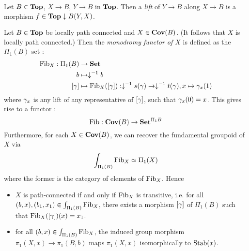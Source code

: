 \documentclass[./main.tex]{subfiles}
\begin{document}
\begin{dfn}[Lift]
  
  Let $B \in \mathbf{Top}$, $X \to B$, $Y \to B$ in $\mathbf{Top}$.
  Then a \emph{lift} of $Y \to B$ along $X \to B$ is 
  a morphism $f \in \mathbf{Top}\downarrow B(Y,X)$.
\end{dfn}

\begin{prop}
  
  Let $B \in \mathbf{Top}$ be locally path connected and $X \in \mathbf{Cov}(B)$.
  (It follows that $X$ is locally path connected.)
  Then the \emph{monodromy functor of $X$} is defined as the $\Pi_1(B)$-set : 
  \begin{align*}
    \FIB_X : \Pi_1(B) &\to \SET \\
    b &\mapsto \downarrow\inv b \\
    [\ga] &\mapsto \FIB_X([\ga]) : 
      \downarrow\inv s(\ga) \to \downarrow\inv t(\ga), 
      x \mapsto \ga_x(1)
  \end{align*}
  where $\gamma_x$ is any lift of any representative of $[\gamma]$,
  such that $\gamma_x(0) = x$.
  This gives rise to a functor : 
  \[
    \operatorname{Fib} : \mathbf{Cov}(B) \to \mathbf{Set}^{\Pi_1 B}
  \]
  Furthermore, for each $X \in \mathbf{Cov}(B)$, 
  we can recover the fundamental groupoid of $X$ via 
  \[
    \int_{\Pi_1(B)} \operatorname{Fib}_X \simeq \Pi_1(X) 
  \]
  where the former is the category of elements of $\operatorname{Fib}_X$.
  Hence \begin{itemize}
    \item $X$ is path-connected if and only if 
    $\operatorname{Fib}_X$ is transitive, 
    i.e. for all $(b,x),(b_1,x_1) \in \int_{\Pi_1(B)} \operatorname{Fib}_X$,
    there exists a morphism $[\gamma]$ of $\Pi_1(B)$ such that 
    $\operatorname{Fib}_X([\gamma])(x) = x_1$.
    \item for all $(b,x) \in \int_{\Pi_1(B)} \operatorname{Fib}_X$,
    the induced group morphism $\pi_1(X,x) \to \pi_1(B,b)$
    maps $\pi_1(X,x)$ isomorphically to $\operatorname{Stab}(x)$.
  \end{itemize}
\end{prop}
\end{document}
